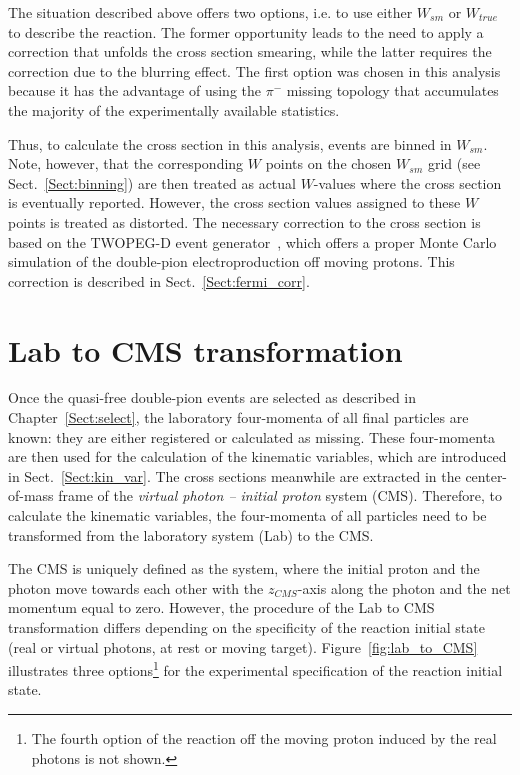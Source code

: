 The situation described above offers two options, i.e. to use either $W_{sm}$ or $W_{true}$ to describe the reaction. The former opportunity leads to the need to apply a correction that unfolds the cross section smearing, while the latter requires the correction due to the blurring effect. The first option was chosen in this analysis because it has the advantage of using the $\pi^{-}$ missing topology that accumulates the majority of the experimentally available statistics. 

Thus, to calculate the cross section in this analysis, events are binned in $W_{sm}$. Note, however, that the corresponding $W$ points on the chosen $W_{sm}$ grid (see Sect.~\ref{Sect:binning}) are then treated as actual $W$-values where the cross section is eventually reported. However, the cross section values assigned to these $W$ points is treated as distorted. The necessary correction to the cross section is based on the TWOPEG-D event generator~\cite{twopeg-d}, which offers a proper Monte Carlo simulation of the double-pion electroproduction off moving protons. This correction is described in Sect.~\ref{Sect:fermi_corr}.




\section{Lab to CMS transformation}
\label{Sect:lab_cms}

Once the quasi-free double-pion events are selected as described in Chapter~\ref{Sect:select}, the laboratory four-momenta of all final particles are known: they are either registered or calculated as missing. These four-momenta are then used for the calculation of the kinematic variables, which are introduced in Sect.~\ref{Sect:kin_var}. The cross sections meanwhile are extracted in the center-of-mass frame of the {\em virtual photon -- initial proton} system (CMS). Therefore, to calculate the kinematic variables, the four-momenta of all particles need to be transformed from the laboratory system (Lab) to the CMS.

The CMS is uniquely defined as the system, where the initial proton and the photon move towards each other with the $z_{CMS}$-axis along the photon and the net momentum equal to zero. However, the procedure of the Lab to CMS transformation differs depending on the specificity of the reaction initial state (real or virtual photons, at rest or moving target). Figure~\ref{fig:lab_to_CMS} illustrates three options\footnote[4]{The fourth option of the reaction off the moving proton induced by the real photons is not shown.} for the experimental specification of the reaction initial state.%

